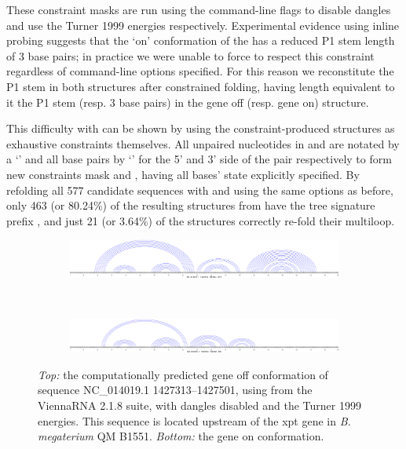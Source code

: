 These constraint masks are run using the command-line flags  to disable dangles and use the Turner 1999 energies respectively. Experimental evidence using inline probing suggests that the `on' conformation of the \grb has a reduced P1 stem length of 3 base pairs; in practice we were unable to force \rfold to respect this constraint regardless of command-line options specified. For this reason we reconstitute the P1 stem in both structures after constrained folding, having length equivalent to it the \infernal P1 stem (resp. 3 base pairs) in the gene off (resp. gene on) structure.

This difficulty with \rfold can be shown by using the constraint-produced structures as exhaustive constraints themselves. All unpaired nucleotides in \strOff and \strOn are notated by a `' and all base pairs by `\ms{()}' for the 5' and 3' side of the pair respectively to form new constraints mask  and , having all bases' state explicitly specified. By refolding all 577 candidate sequences with  and  using the same options as before, only 463 (or 80.24\%) of the resulting structures from  have the tree signature prefix \ms{[0,1,2,2,1]}, and just 21 (or 3.64\%) of the  structures correctly re-fold their multiloop.

\begin{figure}[!ht]
\centering
\begin{subfigure}[h]{\textwidth}
\centering
\includegraphics[width=.9\textwidth]{Figures/Ribofinder/NC_014019_1_1427313_1427501_OFF.pdf}
\end{subfigure} \\
\medskip
\begin{subfigure}[h]{\textwidth}
\centering
\includegraphics[width=.9\textwidth]{Figures/Ribofinder/NC_014019_1_1427313_1427501_ON.pdf}
\end{subfigure}
\caption{{\em Top:} the computationally predicted gene off conformation of sequence NC\_014019.1 1427313--1427501, using \rfold from the ViennaRNA 2.1.8 suite, with dangles disabled and the Turner 1999 energies. This sequence is located upstream of the xpt gene in {\em B. megaterium} QM B1551. {\em Bottom:} the gene on conformation.}
\label{fig:example_ss}
\end{figure}

